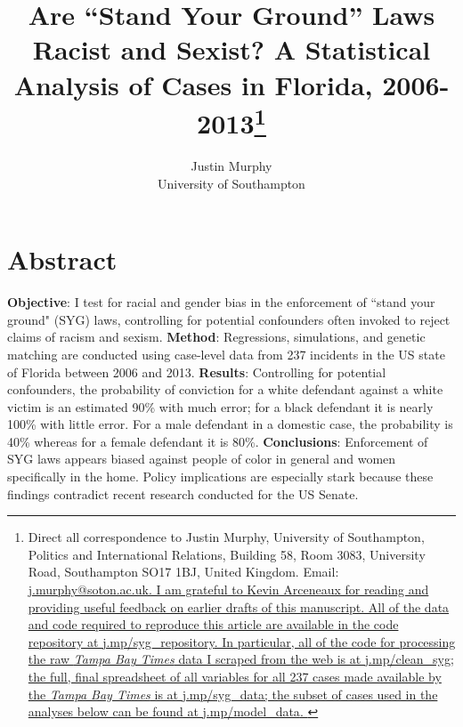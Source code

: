 \documentclass[12pt, oneside]{article}   	%
\title{Are ``Stand Your Ground'' Laws Racist and Sexist? A Statistical Analysis of Cases in Florida, 2006-2013\footnote{Direct all correspondence to Justin Murphy, University of Southampton, Politics and International Relations, Building 58, Room 3083, University Road, Southampton SO17 1BJ, United Kingdom. Email: \href{mailto:j.murphy@soton.ac.uk}{j.murphy@soton.ac.uk. I am grateful to Kevin Arceneaux for reading and providing useful feedback on earlier drafts of this manuscript. All of the
  data and code required to reproduce this article are available in the
  code repository at
  \href{http://j.mp/syg_repository}{j.mp/syg\_repository}. In
  particular, all of the code for processing the raw \emph{Tampa Bay
  Times} data I scraped from the web is at
  \href{http://j.mp/clean_syg}{j.mp/clean\_syg}; the full, final
  spreadsheet of all variables for all 237 cases made available by the
  \emph{Tampa Bay Times} is at
  \href{http://j.mp/syg_data}{j.mp/syg\_data}; the subset of cases used
  in the analyses below can be found at
  \href{http://j.mp/model_data}{j.mp/model\_data}.
}}}
\author{Justin Murphy\\University of Southampton}
\date{}
\begin{document}
\maketitle

\section*{Abstract}
\textbf{Objective}: I test for racial and gender bias in the enforcement of ``stand your ground" (SYG) laws, controlling for potential confounders often invoked to reject claims of racism and sexism. \textbf{Method}: Regressions, simulations, and genetic matching are conducted using case-level data from 237 incidents in the US state of Florida between 2006 and 2013. \textbf{Results}: Controlling for potential confounders, the probability of conviction for a white defendant against a white victim is an estimated 90\% with much error; for a black defendant it is nearly 100\% with little error. For a male defendant in a domestic case, the probability is 40\% whereas for a female defendant it is 80\%. \textbf{Conclusions}: Enforcement of SYG laws appears biased against people of color in general and women specifically in the home. Policy implications are especially stark because these findings contradict recent research conducted for the US Senate. 
\end{document}
